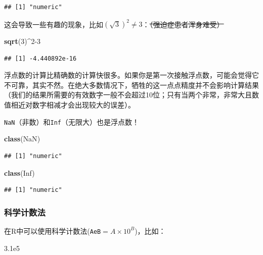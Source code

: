 \documentclass[]{book}
\newenvironment{Shaded}{\begin{snugshade}}{\end{snugshade}}
\newcommand{\DecValTok}[1]{\textcolor[rgb]{0.00,0.00,0.81}{#1}}
\newcommand{\FloatTok}[1]{\textcolor[rgb]{0.00,0.00,0.81}{#1}}
\newcommand{\KeywordTok}[1]{\textcolor[rgb]{0.13,0.29,0.53}{\textbf{#1}}}
\newcommand{\NormalTok}[1]{#1}
\newcommand{\OperatorTok}[1]{\textcolor[rgb]{0.81,0.36,0.00}{\textbf{#1}}}
\newcommand{\OtherTok}[1]{\textcolor[rgb]{0.56,0.35,0.01}{#1}}
\begin{document}
\begin{verbatim}
## [1] "numeric"
\end{verbatim}

这会导致一些有趣的现象，比如\((\sqrt{3})^2 \neq 3\)：\sout{（强迫症患者浑身难受）}

\begin{Shaded}
\begin{Highlighting}[]
\KeywordTok{sqrt}\NormalTok{(}\DecValTok{3}\NormalTok{)}\OperatorTok{^}\DecValTok{2-3}
\end{Highlighting}
\end{Shaded}

\begin{verbatim}
## [1] -4.440892e-16
\end{verbatim}

浮点数的计算比精确数的计算快很多。如果你是第一次接触浮点数，可能会觉得它不可靠，其实不然。在绝大多数情况下，牺牲的这一点点精度并不会影响计算结果（我们的结果所需要的有效数字一般不会超过10位；只有当两个非常，非常大且数值相近对数字相减才会出现较大的误差）。

\texttt{NaN}（非数）和\texttt{Inf}（无限大）也是浮点数！

\begin{Shaded}
\begin{Highlighting}[]
\KeywordTok{class}\NormalTok{(}\OtherTok{NaN}\NormalTok{)}
\end{Highlighting}
\end{Shaded}

\begin{verbatim}
## [1] "numeric"
\end{verbatim}

\begin{Shaded}
\begin{Highlighting}[]
\KeywordTok{class}\NormalTok{(}\OtherTok{Inf}\NormalTok{)}
\end{Highlighting}
\end{Shaded}

\begin{verbatim}
## [1] "numeric"
\end{verbatim}

\subsubsection{科学计数法}

在R中可以使用科学计数法(\texttt{AeB}\(= A \times 10^B\))，比如：

\begin{Shaded}
\begin{Highlighting}[]
\FloatTok{3.1e5}
\end{Highlighting}
\end{Shaded}
\end{document}
